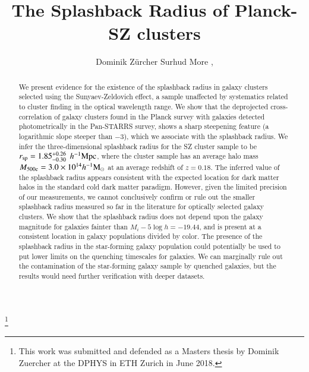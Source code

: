 \documentclass[iop, apjl, twocolappendix, numberedappendix]{emulateapj}
\def\mpch{h^{-1}{\rm Mpc}}
\def\msunh{h^{-1}{\rm M_{\odot}}}
\begin{document}
\title{The Splashback Radius of Planck-SZ clusters}

\thanks{This work was submitted and defended as a Masters thesis by Dominik
Zuercher at the DPHYS in ETH Zurich in June 2018.}

\author{
Dominik Zürcher 
Surhud More ,
}

\begin{abstract}
We present evidence for the existence of the splashback radius in galaxy
clusters selected using the Sunyaev-Zeldovich effect, a sample unaffected by
systematics related to cluster finding in the optical wavelength range. We show
that the deprojected cross-correlation of galaxy clusters found in the Planck
survey with galaxies detected photometrically in the Pan-STARRS survey, shows a
sharp steepening feature (a logarithmic slope steeper than $-3$), which we
associate with the splashback radius. We infer the three-dimensional splashback
radius for the SZ cluster sample to be $r_{\rm sp}=1.85_{-0.30}^{+0.26}$
$\mpch$, where the cluster sample has an average halo mass $M_{\rm
500c}=3.0\times10^{14}\msunh$ at an average redshift of $z=0.18$.  The inferred
value of the splashback radius appears consistent with the expected location
for dark matter halos in the standard cold dark matter paradigm. However, given
the limited precision of our measurements, we cannot conclusively confirm or
rule out the smaller splashback radius measured so far in the literature for
optically selected galaxy clusters. We show that the splashback radius does not
depend upon the galaxy magnitude for galaxies fainter than $M_i-5\log
h=-19.44$, and is present at a consistent location in galaxy populations
divided by color. The presence of the splashback radius in the star-forming
galaxy population could potentially be used to put lower limits on the
quenching timescales for galaxies. We can marginally rule out the contamination
of the star-forming galaxy sample by quenched galaxies, but the results would
need further verification with deeper datasets.

\end{abstract}
\end{document}
